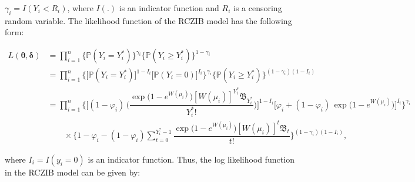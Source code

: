 \documentclass[twoside]{article}
\begin{document}
$ \gamma_i = I ( Y_i < R_i ) $,
where
$ I(.) $ 
is an indicator function and
$ R_i $
is a censoring random variable. The likelihood function of the RCZIB model has the following form:
\begin{small}
\begin{align*}
L ( \boldsymbol{ \theta } , \boldsymbol{ \delta } ) & =  \prod_{ i = 1 }^n \Big \lbrace \mathbb{P} ( Y_i = Y_i^* ) \Big \rbrace^{ \gamma_i } \Big \lbrace \mathbb{P} ( Y_i \geq Y_i^* ) \Big \rbrace^{ 1 - \gamma_i }
\\ 
& =  \prod_{ i = 1 }^n \Big \lbrace \big [ \mathbb{P} ( Y_i = Y_i^* ) \big ]^{ 1- I_i } \big [ \mathbb{P} ( Y_i = 0  ) \big ]^{ I_i } \Big \rbrace^{ \gamma_i } \Big \lbrace \mathbb{P} ( Y_i \geq Y_i^* ) \Big \rbrace^{ ( 1 - \gamma_i ) ( 1 - I_i ) }
\\ 
& =  \prod_{ i = 1 }^n \Bigg \lbrace \Big [ (1  -  \varphi_i) \, \Big (  \dfrac{  \exp{ \big ( 1 - e^{ W ( \mu_i ) }   \big )  [ W ( \mu_i ) ]^{Y_i^*} \mathfrak{B}_{Y_i^*} }}{ Y_i^* ! }  \Big )  \Big ]^{ 1 - I_i }  
\Big  [  \varphi_i + (1-\varphi_i) \, \exp{ \big ( 1 - e^{ W ( \mu_i ) }   \big )}  \Big  ]^{ I_i } \Bigg \rbrace^{ \gamma_i } 
\\ 
&  \qquad \times  \Bigg \lbrace 1 - \varphi_i - ( 1 - \varphi_i )  \sum_{ t = 0}^{Y_i^* - 1}   \dfrac{  \exp{ \big ( 1 - e^{ W ( \mu_i ) }   \big )  [ W ( \mu_i ) ]^{t} \mathfrak{B}_{t} }}{ t ! }    \Bigg \rbrace^{ ( 1 - \gamma_i ) ( 1 - I_i ) } ,
\end{align*}
\end{small}
where $ I_i = I (y_i = 0)  $ is an indicator function. Thus, the log likelihood function in the RCZIB model can be given by:
\end{document}
